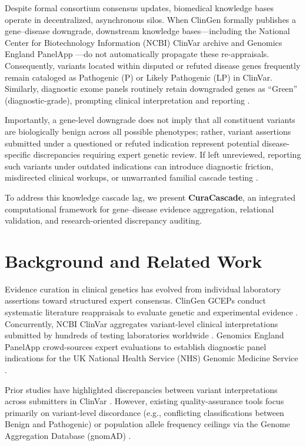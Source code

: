 \documentclass[conference]{IEEEtran}
\begin{document}
Despite formal consortium consensus updates, biomedical knowledge bases operate in decentralized, asynchronous silos. When ClinGen formally publishes a gene--disease downgrade, downstream knowledge bases---including the National Center for Biotechnology Information (NCBI) ClinVar archive \cite{landrum2020clinvar} and Genomics England PanelApp \cite{martin2019panelapp}---do not automatically propagate these re-appraisals. Consequently, variants located within disputed or refuted disease genes frequently remain cataloged as Pathogenic (P) or Likely Pathogenic (LP) in ClinVar. Similarly, diagnostic exome panels routinely retain downgraded genes as ``Green'' (diagnostic-grade), prompting clinical interpretation and reporting \cite{wright2015genetic}.

Importantly, a gene-level downgrade does not imply that all constituent variants are biologically benign across all possible phenotypes; rather, variant assertions submitted under a questioned or refuted indication represent potential disease-specific discrepancies requiring expert genetic review. If left unreviewed, reporting such variants under outdated indications can introduce diagnostic friction, misdirected clinical workups, or unwarranted familial cascade testing \cite{ingles2019evaluating}.

To address this knowledge cascade lag, we present \textbf{CuraCascade}, an integrated computational framework for gene--disease evidence aggregation, relational validation, and research-oriented discrepancy auditing.

\section{Background and Related Work}
Evidence curation in clinical genetics has evolved from individual laboratory assertions toward structured expert consensus. ClinGen GCEPs conduct systematic literature reappraisals to evaluate genetic and experimental evidence \cite{strande2017evaluating}. Concurrently, NCBI ClinVar aggregates variant-level clinical interpretations submitted by hundreds of testing laboratories worldwide \cite{landrum2020clinvar}. Genomics England PanelApp crowd-sources expert evaluations to establish diagnostic panel indications for the UK National Health Service (NHS) Genomic Medicine Service \cite{martin2019panelapp}.

Prior studies have highlighted discrepancies between variant interpretations across submitters in ClinVar \cite{richards2015standards}. However, existing quality-assurance tools focus primarily on variant-level discordance (e.g., conflicting classifications between Benign and Pathogenic) or population allele frequency ceilings via the Genome Aggregation Database (gnomAD) \cite{karczewski2020mutational}. 
\end{document}
